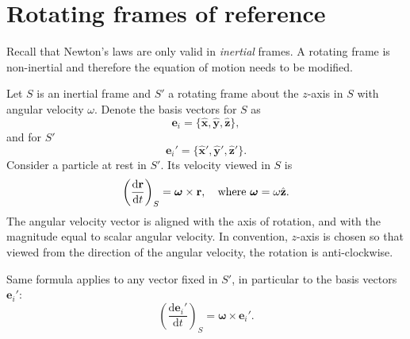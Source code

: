 \section{Rotating frames of reference}
Recall that Newton's laws are only valid in \textit{inertial} frames. A rotating frame is non-inertial and therefore the equation of motion needs to be modified.

Let $S$ is an inertial frame and $S'$ a rotating frame about the $z$-axis in $S$ with angular velocity $ \omega $. Denote the basis vectors for $S$ as 
\[
    \mathbf{e}_i = \{\hat{\mathbf{x}},\hat{\mathbf{y}},\hat{\mathbf{z}}\},
\]
and for $S'$ 
\[
    \mathbf{e}_i' = \{\hat{\mathbf{x}}',\hat{\mathbf{y}}',\hat{\mathbf{z}}'\}.
\]
Consider a particle at rest in $S'$. Its velocity viewed in $S$ is 
\[
    \left( \frac{\mathrm{d}\mathbf{r}}{\mathrm{d}t}  \right)_S = \boldsymbol{\omega} \times \mathbf{r},\quad \text{where $ \boldsymbol{\omega}=\omega \hat{\mathbf{z}} $}.
\]
The angular velocity vector is aligned with the axis of rotation, and with the magnitude equal to scalar angular velocity. In convention, $z$-axis is chosen so that viewed from the direction of the angular velocity, the rotation is anti-clockwise.

Same formula applies to any vector fixed in $S'$, in particular to the basis vectors $ \mathbf{e}_i' $:
\[
    \left( \frac{\mathrm{d}\mathbf{e}_i'}{\mathrm{d}t}  \right)_S = \boldsymbol{\omega}\times \mathbf{e}_i'.
\]

